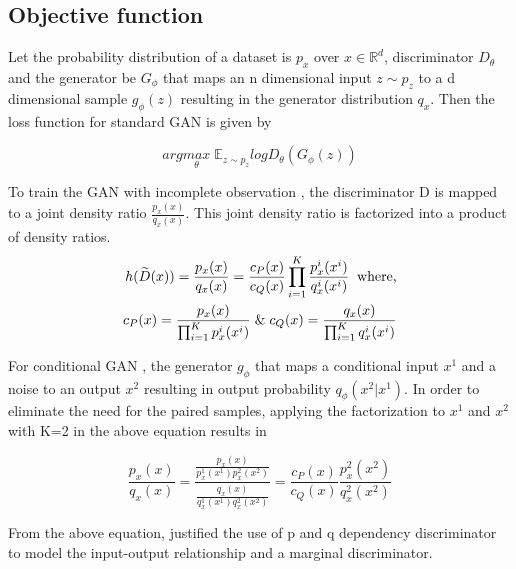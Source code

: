 \subsection{Objective function}
Let the probability distribution of a dataset is $p_x$ over $x \in \mathbb{R}^d$, discriminator $D_\theta$ and the generator be $G_\phi$ that maps an n dimensional input $z \sim p_z$ to a d dimensional sample $g_\phi(z)$ resulting in the generator distribution $q_x$. Then the loss function \citep{stoller2019training} for standard GAN is given by

\begin{equation*}
arg\underset{\theta}{max}\;\mathbb{E}_{z\sim p_{z}} log D_\theta(G_\phi(z))
\end{equation*}	

To train the GAN with incomplete observation \citep{stoller2019training}, the discriminator D is mapped to a joint density ratio $\frac{p_x(x)}{q_x(x)}$. This joint density ratio is factorized into a product of density ratios.
\begin{align*}
h(\widetilde{D}(x)) = \frac{p_x(x)}{q_x(x)} = \frac{c_P(x)}{c_Q(x)}\prod_{i=1}^{K}\frac{p_x^i(x^i)}{q_x^i(x^i)}\;\;\text{where,}\\c_P(x)= \frac{p_x(x)}{\prod_{i=1}^{K}p_x^i(x^i)}\text{\;\&}\; c_Q(x)= \frac{q_x(x)}{\prod_{i=1}^{K}q_x^i(x^i)}
\end{align*}

For conditional GAN \citep{stoller2019training}, the generator $g_\phi$ that maps a conditional input $x^1$ and a noise to an output $x^2$ resulting in output probability $q_\phi(x^2|x^1)$. In order to eliminate the need for the paired samples, applying the factorization to $x^1$ and $x^2$ with K=2 in the above equation results in 

\begin{equation*}
\frac{p_x(x)}{q_x(x)} = \frac{\frac{p_x(x)}{p_x^1(x^1)p_x^2(x^2)}}{\frac{q_x(x)}{q_x^1(x^1)q_x^2(x^2)}} = \frac{c_P(x)}{c_Q(x)}\frac{p_x^2(x^2)}{q_x^2(x^2)}
\end{equation*}	


From the above equation, \citeauthor{stoller2019training} justified the use of p and q dependency discriminator to model the input-output relationship and a marginal discriminator.
\newline 


